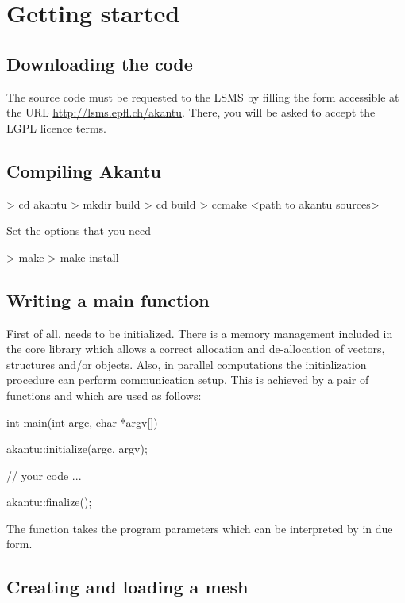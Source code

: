 \chapter{Getting started}
\section{Downloading the code}

The \akantu source code must be requested to the LSMS by 
filling the form accessible at the URL \url{http://lsms.epfl.ch/akantu}.
There, you will be asked to accept the LGPL licence terms.

\section{Compiling Akantu}
\begin{command}
  > cd akantu
  > mkdir build
  > cd build
  > ccmake <path to akantu sources>
\end{command}

Set the options that you need

\begin{command}
  > make
  > make install
\end{command}

\section{Writing a main function\label{sect:common:main}}

First of all, \akantu needs to be initialized. 
There is a memory management included in the core library
which allows a correct allocation and de-allocation of 
vectors, structures and/or objects. Also, in parallel computations
the initialization procedure can perform communication 
setup. This is achieved by a pair of functions 
and  which are used as follows:
\begin{cpp}
int main(int argc, char *argv[])
{
  akantu::initialize(argc, argv);

  // your code
  ... 

  akantu::finalize();
}
\end{cpp} 
The  function takes the program parameters which 
can be interpreted by \akantu in due form.

\section{Creating and loading a mesh\label{sect:common:mesh}}

